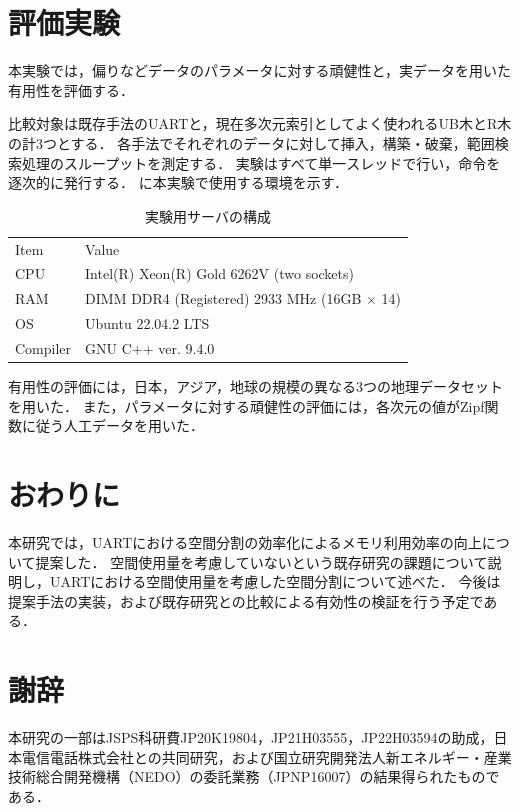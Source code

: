 \chapter{評価実験}

本実験では，偏りなどデータのパラメータに対する頑健性と，実データを用いた有用性を評価する．

比較対象は既存手法のUARTと，現在多次元索引としてよく使われるUB木とR木の計3つとする．
各手法でそれぞれのデータに対して挿入，構築・破棄，範囲検索処理のスループットを測定する．
実験はすべて単一スレッドで行い，命令を逐次的に発行する．
\Tab{\ref{tab:environment}}に本実験で使用する環境を示す．

\begin{table}[tb]
  \caption{実験用サーバの構成}
  \label{tab:environment}
  \centering
  \begin{tabular}{ll}
    \toprule
    Item     & Value                                              \\
    \cmidrule(r){1-1}
    \cmidrule(l){2-2}
    CPU      & Intel(R) Xeon(R) Gold 6262V (two sockets)          \\
    RAM      & DIMM DDR4 (Registered) 2933 MHz (16GB $\times$ 14) \\
    OS       & Ubuntu 22.04.2 LTS                                 \\
    Compiler & GNU C++ ver. 9.4.0                                 \\
    \bottomrule
  \end{tabular}
\end{table}

有用性の評価には，日本，アジア，地球の規模の異なる3つの地理データセットを用いた．
また，パラメータに対する頑健性の評価には，各次元の値がZipf関数に従う人工データを用いた．







\chapter{おわりに}

本研究では，UARTにおける空間分割の効率化によるメモリ利用効率の向上について提案した．
空間使用量を考慮していないという既存研究の課題について説明し，UARTにおける空間使用量を考慮した空間分割について述べた．
今後は提案手法の実装，および既存研究との比較による有効性の検証を行う予定である．





\chapter*{謝辞}

本研究の一部はJSPS科研費JP20K19804，JP21H03555，JP22H03594の助成，日本電信電話株式会社との共同研究，および国立研究開発法人新エネルギー・産業技術総合開発機構（NEDO）の委託業務（JPNP16007）の結果得られたものである．